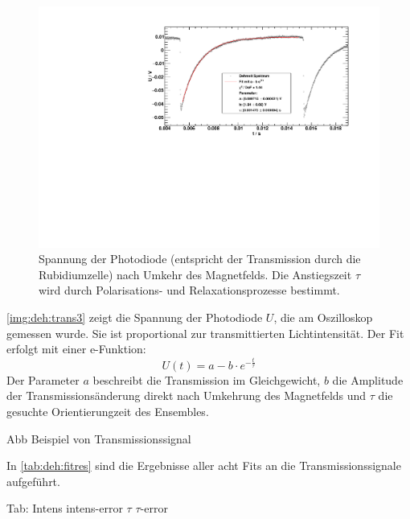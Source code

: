 \begin{figure}[H]
\begin{center}
  \includegraphics[width=\textwidth]{../img/part5/65-5mA-10.pdf}
  \caption{Spannung der Photodiode (entspricht der Transmission durch die Rubidiumzelle)
  nach Umkehr des Magnetfelds. Die Anstiegszeit $\tau$ wird durch Polarisations- und Relaxationsprozesse bestimmt.}
  \label{img:img:deh:trans3}
\end{center}
\end{figure}

\autoref{img:deh:trans3} zeigt die Spannung der Photodiode $U$, die am Oszilloskop gemessen wurde.
Sie ist proportional zur transmittierten Lichtintensität.
Der Fit erfolgt mit einer e-Funktion:
\begin{equation}
  U(t)=a - b \cdot e^{-\frac{t}{\tau}}
\end{equation}
Der Parameter $a$ beschreibt die Transmission im Gleichgewicht, $b$ die Amplitude der
Transmissionsänderung direkt nach Umkehrung des Magnetfelds und $\tau$ die gesuchte Orientierungzeit des Ensembles.


Abb Beispiel von Transmissionssignal
 


In \autoref{tab:deh:fitres} sind die Ergebnisse aller acht Fits an die Transmissionssignale aufgeführt.

Tab:
Intens		intens-error	$\tau$		$\tau$-error
 

